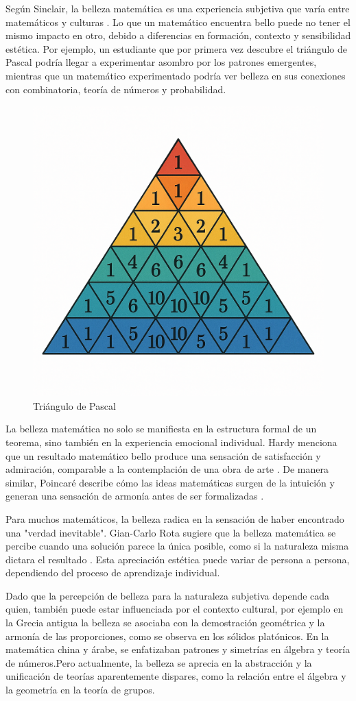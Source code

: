 \documentclass[twocolumn]{article}
\begin{document}
Según Sinclair, la belleza matemática es una experiencia subjetiva que varía entre matemáticos y culturas \cite{sinclair2006}. Lo que un matemático encuentra bello puede no tener el mismo impacto en otro, debido a diferencias en formación, contexto y sensibilidad estética. Por ejemplo, un estudiante que por primera vez descubre el triángulo de Pascal podría llegar a  experimentar asombro por los patrones emergentes, mientras que un matemático experimentado podría ver belleza en sus conexiones con combinatoria, teoría de números y probabilidad.

\begin{figure}
    \centering
    \includegraphics[width=0.5\linewidth]{imagen4.png}
    \caption{Triángulo de Pascal}
    \label{fig:enter-label}
\end{figure}


La belleza matemática no solo se manifiesta en la estructura formal de un teorema, sino también en la experiencia emocional individual. Hardy menciona que un resultado matemático bello produce una sensación de satisfacción y admiración, comparable a la contemplación de una obra de arte \cite{hardy1940}. De manera similar, Poincaré describe cómo las ideas matemáticas surgen de la intuición y generan una sensación de armonía antes de ser formalizadas \cite{poincare1913}.

Para muchos matemáticos, la belleza radica en la sensación de haber encontrado una "verdad inevitable". Gian-Carlo Rota sugiere que la belleza matemática se percibe cuando una solución parece la única posible, como si la naturaleza misma dictara el resultado \cite{rota1997}. Esta apreciación estética puede variar de persona a persona, dependiendo del proceso de aprendizaje individual.

Dado que la percepción de belleza para la naturaleza subjetiva depende cada quien, también puede estar influenciada por el contexto cultural, por ejemplo en la Grecia antigua la belleza se asociaba con la demostración geométrica y la armonía de las proporciones, como se observa en los sólidos platónicos. En la matemática china y árabe, se enfatizaban patrones y simetrías en álgebra y teoría de números.Pero actualmente, la belleza se aprecia en la abstracción y la unificación de teorías aparentemente dispares, como la relación entre el álgebra y la geometría en la teoría de grupos.
\end{document}
